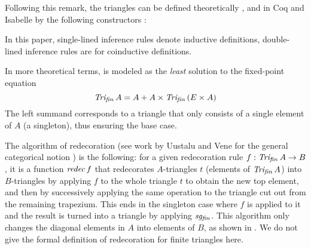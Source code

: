 \vspace{-1ex}
Following this remark, the triangles can be defined
 theoretically \cite{grossestcspaper}, and in Coq and
Isabelle by the following constructors \cite{types07}:\\[-4ex]
\begin{multicols}{2}
  \begin{prooftree}
  \end{prooftree}
  \begin{prooftree}
  \end{prooftree}
\end{multicols}

\vspace{-2.5ex}
\begin{remark}
  In this paper, single-lined inference rules denote 
  inductive definitions, double-lined inference rules are for
  coinductive definitions. 
\end{remark}

In more theoretical terms, \Trif{} is modeled as the \emph{least}
solution to the fixed-point equation
$$\Trif\,A=A+ A\times\Trif\,(E\times A)$$
The left summand corresponds to a triangle that only consists of a
single element of $A$ (a singleton), thus ensuring the base case.

The algorithm of redecoration (see work by Uustalu and Vene for
the general
categorical notion  \cite{DBLP:conf/sfp/UustaluV01}) is the following: for a given redecoration rule
$f:\Trif\,A\to B$, it is a function $\redec\,f$ that redecorates
$A$-triangles $t$ (elements of $\Trif\,A$) into $B$-triangles by
applying $f$ to the whole triangle $t$ to obtain the new top element,
and then by successively applying the same operation to the triangle
cut out from the remaining trapezium. This ends in the singleton case
where $f$ is applied to it and the result is turned into a triangle by
applying $\sgf$.  This algorithm only changes the diagonal elements in
$A$ into elements of $B$, as shown in . We do not give
the formal definition of redecoration for finite triangles here.

